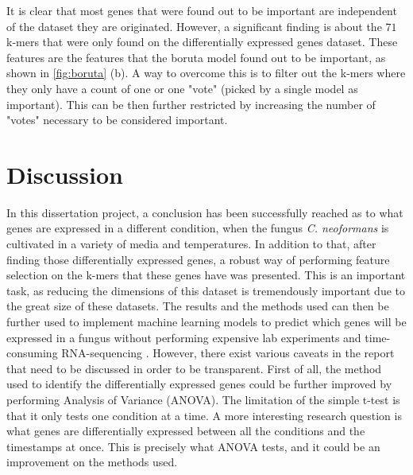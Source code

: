 \documentclass[11pt,twoside]{article}
\numberwithin{Theorem}{section}
\numberwithin{Definition}{section}
\numberwithin{Lemma}{section}
\numberwithin{Algorithm}{section}
\numberwithin{equation}{section}
\begin{document}
It is clear that most genes that were found out to be important are independent of the dataset they are originated. However, a significant finding is about the $71$ k-mers that were only found on the differentially expressed genes dataset. These features are the features that the boruta model found out to be important, as shown in \autoref{fig:boruta} (b). A way to overcome this is to filter out the k-mers where they only have a count of one or one "vote" (picked by a single model as important). This can be then further restricted by increasing the number of "votes" necessary to be considered important. 

\cleardoublepage
\section{Discussion}
\label{sec:discussion}

In this dissertation project, a conclusion has been successfully reached as to what genes are expressed in a different condition, when the fungus \emph{C. neoformans} is cultivated in a variety of media and temperatures. In addition to that, after finding those differentially expressed genes, a robust way of performing feature selection on the k-mers that these genes have was presented. This is an important task, as reducing the dimensions of this dataset is tremendously important due to the great size of these datasets. The results and the methods used can then be further used to implement machine learning models to predict which genes will be expressed in a fungus without performing expensive lab experiments and time-consuming RNA-sequencing
.
However, there exist various caveats in the report that need to be discussed in order to be transparent. First of all, the method used to identify the differentially expressed genes could be further improved by performing Analysis of Variance (ANOVA). The limitation of the simple t-test is that it only tests one condition at a time. A more interesting research question is what genes are differentially expressed between all the conditions and the timestamps at once. This is precisely what ANOVA tests, and it could be an improvement on the methods used. 
\end{document}
